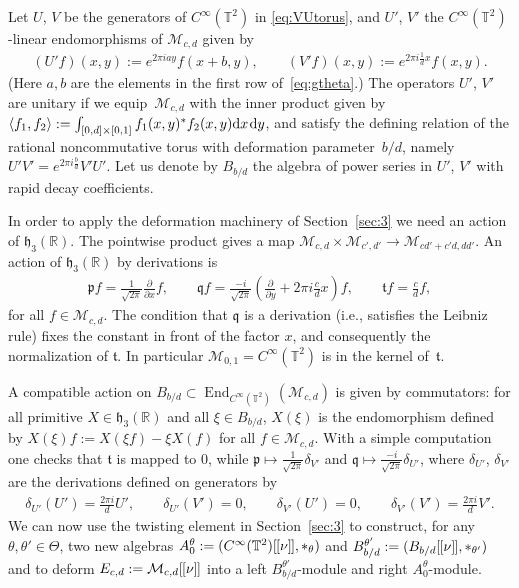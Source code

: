 \documentclass[pdftex]{sigma}
\numberwithin{equation}{section}
\theoremstyle{definition}
\newcommand{\R}{\mathbb{R}}
\newcommand{\T}{\mathbb{T}}
\newcommand{\mf}{\mathfrak}
\newcommand{\inner}[1]{\left<\smash[t]{#1}\right>}
\newcommand{\de}{\mathrm{d}}
\newcommand{\lbrak}{[\hspace{-0.5pt}[}
\newcommand{\rbrak}{]\hspace{-0.5pt}]}
\newcommand{\ga}{\mf{p}}
\newcommand{\gb}{\mf{q}}
\newcommand{\gc}{\mf{t}}
\begin{document}
Let $U$, $V$ be the generators of $C^\infty(\T^2)$ in \eqref{eq:VUtorus}, and $U'$, $V'$ the
$C^\infty(\T^2)$-linear endomorphisms of $\mathcal{M}_{c,d}$ given by
\begin{gather*}
(U'f)(x,y):=e^{2\pi iay}f(x+b,y) ,\qquad
(V'f)(x,y):=e^{2\pi i\frac{1}{d}x}f(x,y) .
\end{gather*}
(Here $a,b$ are the elements in the f\/irst row of~\eqref{eq:gtheta}.)
The operators $U'$, $V'$ are unitary if we equip~$\mathcal{M}_{c,d}$ with the inner product given by~$\inner{f_1,f_2}:=\int_{[0,d]\times [0,1]}f_1(x,y)^*f_2(x,y)\de x\hspace{1pt}\de y$,
and satisfy the def\/ining relation of the rational noncommutative torus with deformation parame\-ter~$b/d$, namely $U'V'=e^{2\pi i\frac{b}{d}}V'U'$.
Let us denote by $B_{b/d}$ the algebra of power series in $U'$, $V'$ with rapid decay coef\/f\/icients.

In order to apply the deformation machinery of Section~\ref{sec:3} we need an action of $\mf{h}_3(\R)$.
The pointwise product gives a map $\mathcal{M}_{c,d}\times\mathcal{M}_{c',d'}\to\mathcal{M}_{cd'+c'd,dd'}$. An action of $\mf{h}_3(\R)$ by derivations is
\begin{gather*}
\ga f=\frac{1}{\sqrt{2\pi}}\frac{\partial}{\partial x}f
,\qquad
\gb f=\frac{-i}{\sqrt{2\pi}}\left(\frac{\partial}{\partial y}+2\pi i\frac{c}{d}x\right)f
,\qquad
\gc f=\frac{c}{d}f
,
\end{gather*}
for all $f\in\mathcal{M}_{c,d}$.
The condition that $\gb$ is a derivation (i.e., satisf\/ies the Leibniz rule) f\/ixes the constant in front of the factor $x$, and consequently the normalization of $\gc$.
In particular $\mathcal{M}_{0,1}=C^\infty(\T^2)$ is in the kernel of~$\gc$.

A compatible action on $B_{b/d}\subset\operatorname{End}_{C^\infty(\T^2)}(\mathcal{M}_{c,d})$ is given by commutators: for all primitive $X\in\mf{h}_3(\R)$ and all $\xi\in B_{b/d}$, $X(\xi)$ is the endomorphism def\/ined by
$X(\xi)f :=X(\xi f)-\xi X(f)$ for all $f\in\mathcal{M}_{c,d}$.
With a simple computation one checks that $\gc$ is mapped to $0$, while $\ga\mapsto\frac{1}{\sqrt{2\pi}}\delta_{V'}$ and $\gb\mapsto\frac{-i}{\sqrt{2\pi}}\delta_{U'}$, where $\delta_{U'}$, $\delta_{V'}$ are the derivations def\/ined on generators by
\begin{gather*}
\delta_{U'}(U')=\tfrac{2\pi i}{d} U' ,\qquad
\delta_{U'}(V')=0 ,\qquad
\delta_{V'}(U')=0 ,\qquad
\delta_{V'}(V')=\tfrac{2\pi i}{d} V' .
\end{gather*}
We can now use the twisting element in Section~\ref{sec:3} to construct,
for any $\theta,\theta'\in\Theta$,
two new algebras $A_0^\theta:=(C^\infty(\T^2)\lbrak\nu\rbrak,\ast_\theta)$
and
$B_{b/d}^{\theta'}:=(B_{b/d}\lbrak\nu\rbrak,\ast_{\theta'})$
and to deform
$E_{c,d}:=\mathcal{M}_{c,d}\lbrak\nu\rbrak$ into a left
$B_{b/d}^{\theta'}$-module and right $A_0^\theta$-module.
\end{document}
